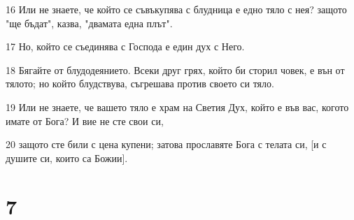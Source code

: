 \par 16 Или не знаете, че който се съвъкупява с блудница е едно тяло с нея? защото "ще бъдат", казва, "двамата една плът".
\par 17 Но, който се съединява с Господа е един дух с Него.
\par 18 Бягайте от блудодеянието. Всеки друг грях, който би сторил човек, е вън от тялото; но който блудствува, съгрешава против своето си тяло.
\par 19 Или не знаете, че вашето тяло е храм на Светия Дух, който е във вас, когото имате от Бога? И вие не сте свои си,
\par 20 защото сте били с цена купени; затова прославяте Бога с телата си, [и с душите си, които са Божии].

\chapter{7}

